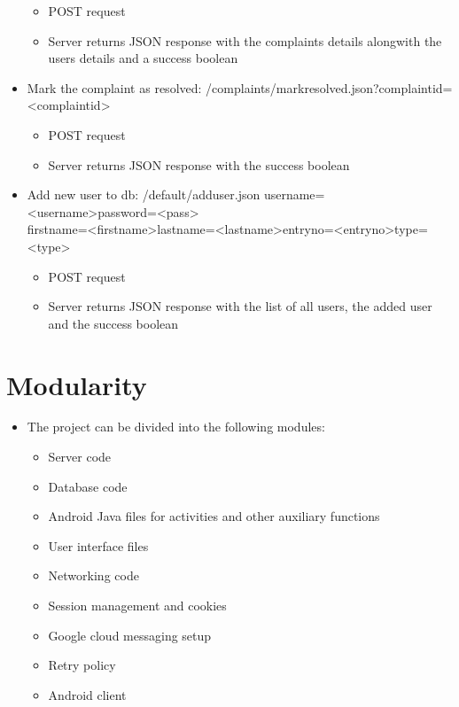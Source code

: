 \documentclass[12pt]{article}
\begin{document}
\begin{itemize}
	\begin{itemize}
		\color{blue}
		\item POST request
		\item Server returns JSON response with the complaints details alongwith the users details and a success boolean
	\end{itemize}
\item Mark the complaint as resolved: /complaints/markresolved.json?complaintid=<complaintid>
	\begin{itemize}
		\color{blue}
		\item POST request
		\item Server returns JSON response with the success boolean
	\end{itemize}
\item Add new user to db: /default/adduser.json
username=<username>password=<pass>\\firstname=<firstname>lastname=<lastname>entryno=<entryno>type=<type>
	\begin{itemize}
		\color{blue}
		\item POST request
		\item Server returns JSON response with the list of all users, the added user and the success boolean
	\end{itemize}
\end{itemize}


\section{Modularity}
\begin{itemize}
\item The project can be divided into the following modules:
	\begin{itemize}
		\color{blue}
		\item Server code
		\item Database code
		\item Android Java files for activities and other auxiliary functions
		\item User interface files
		\item Networking code
		\item Session management and cookies
		\item Google cloud messaging setup
		\item Retry policy
		\item Android client
	\end{itemize}
\end{itemize}
\end{document}
